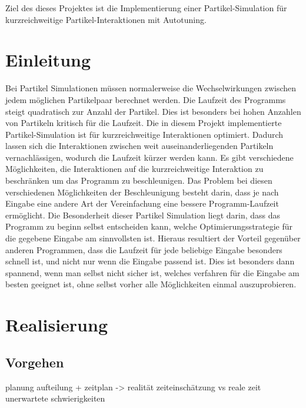 \documentclass[
	12pt,
	a4paper,
	BCOR10mm,
	DIV14,
	headsepline,
]{scrreprt}
\begin{document}
\thispagestyle{empty}

Ziel des dieses Projektes ist die Implementierung einer Partikel-Simulation für kurzreichweitige Partikel-Interaktionen mit Autotuning.

\tableofcontents

\chapter{Einleitung}
\label{Einleitung}

Bei Partikel Simulationen müssen normalerweise die Wechselwirkungen zwischen jedem möglichen Partikelpaar berechnet werden. Die Laufzeit des Programms steigt quadratisch zur Anzahl der Partikel. Dies ist besonders bei hohen Anzahlen von Partikeln kritisch für die Laufzeit. Die in diesem Projekt implementierte Partikel-Simulation ist für kurzreichweitige Interaktionen optimiert. Dadurch lassen sich die Interaktionen zwischen weit auseinanderliegenden Partikeln vernachlässigen, wodurch die Laufzeit kürzer werden kann. Es gibt verschiedene Möglichkeiten, die Interaktionen auf die kurzreichweitige Interaktion zu beschränken um das Programm zu beschleunigen. Das Problem bei diesen verschiedenen Möglichkeiten der Beschleunigung besteht darin, dass je nach Eingabe eine andere Art der Vereinfachung eine bessere Programm-Laufzeit ermöglicht. Die Besonderheit dieser Partikel Simulation liegt darin, dass das Programm zu beginn selbst entscheiden kann, welche Optimierungsstrategie für die gegebene Eingabe am sinnvollsten ist. Hieraus resultiert der Vorteil gegenüber anderen Programmen, dass die Laufzeit für jede beliebige Eingabe besonders schnell ist, und nicht nur wenn die Eingabe passend ist. Dies ist besonders dann spannend, wenn man selbst nicht sicher ist, welches verfahren für die Eingabe am besten geeignet ist, ohne selbst vorher alle Möglichkeiten einmal auszuprobieren.

\chapter{Realisierung}
\label{Realisierung}
\section{Vorgehen}

planung
aufteilung + zeitplan -> realität
zeiteinschätzung vs reale zeit
unerwartete schwierigkeiten

\newpage
\end{document}
